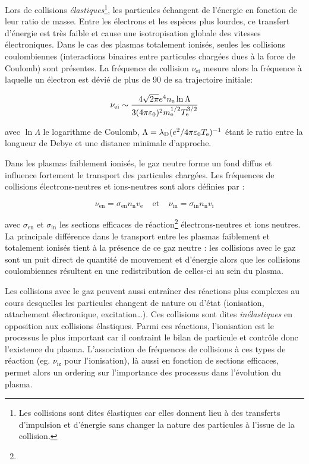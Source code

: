 \begin{refsection}
Lors de collisions \emph{élastiques}\footnote{Les collisions sont dites élastiques car
elles donnent lieu à des transferts d'impulsion et d'énergie sans changer
la nature des particules à l'issue de la collision.}, les particules échangent de l'énergie 
en fonction de leur ratio de masse. Entre les électrons et les espèces plus
lourdes, ce transfert d'énergie est très faible et cause une isotropisation
globale des vitesses électroniques.
Dans le cas des plasmas totalement ionisés, seules les collisions coulombiennes 
(interactions binaires entre particules chargées dues à la force de Coulomb)
sont présentes. 
La fréquence de collision $\nu_\text{ei}$ mesure alors la fréquence à laquelle un
électron est dévié de plus de \unit{90}{\degree} de sa trajectoire initiale:

\begin{equation}
	\nu_\text{ei}\sim\frac{4\sqrt{2\pi}e^{{4}} n_\text{e} \ln\Lambda
	}{3(4\pi\varepsilon{_{0}})^{{2}}m_\text{e}^{{1/2}}T_\text{e}^{{3/2}}}
\end{equation}

avec $\ln \Lambda$ le logarithme de Coulomb,
$\Lambda=\lambda_\text{D}(e^{{2}}/4\pi\varepsilon{_{0}}
T_\text{e})^{{-1}}$ étant le ratio entre la longueur de Debye et une
distance minimale d'approche.

Dans les plasmas faiblement ionisés, le
gaz neutre forme un fond diffus et influence fortement le transport des particules chargées.
Les fréquences de collisions électrons-neutres et ions-neutres sont alors
définies par :

\begin{equation}
	\nu_\text{en}=\sigma_\text{en} n_\text{n} v_\text{e}
	\;\;\;\;\text{et}\;\;\;\;\nu_\text{in}=\sigma_\text{in} n_\text{n} v_\text{i}
\end{equation} 
 
avec $\sigma_\text{en}$ et $\sigma_\text{in}$ les sections efficaces de
réaction\footnote{} électrons-neutres et ions neutres. La principale
différence dans le transport entre les plasmas faiblement et totalement ionisés tient à la
présence de ce gaz neutre : les collisions avec le gaz sont un puit
direct de quantité de mouvement et d'énergie alors que les
collisions coulombiennes résultent en une redistribution de celles-ci au sein
du plasma.

Les collisions avec le gaz peuvent aussi entraîner des réactions plus complexes
au cours desquelles les particules changent de nature ou d'état (ionisation,
attachement électronique, excitation\ldots).
Ces collisions sont dites \emph{inélastiques} en opposition aux collisions
élastiques. Parmi ces réactions, l'ionisation est le processus le plus
important car il contraint le bilan de particule et contrôle donc l'existence
du plasma. L'association de fréquences de collisions à ces types de réaction
(eg. $\nu_\text{iz}$ pour l'ionisation), là aussi en fonction de sections
efficaces, permet alors un ordering sur l'importance des processus dans l'évolution du plasma.


\end{refsection}
